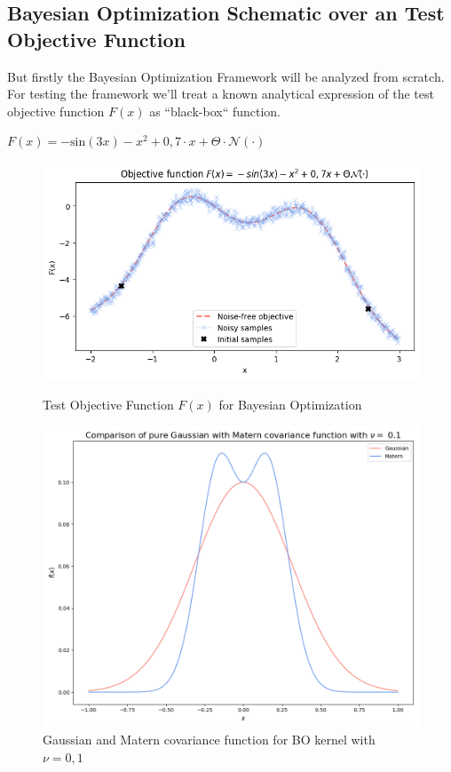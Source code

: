 \documentclass[12pt, a4paper]{article}
\begin{document}
\subsection{Bayesian Optimization Schematic over an Test Objective Function}
But firstly the Bayesian Optimization Framework will be analyzed from scratch. For testing the framework we'll treat a known analytical expression of the test objective function $F(x)$ as ``black-box`` function.
\begin{center}
    $F(x) = - \text{sin}(3x) - x^2 + 0,7 \cdot x + \Theta \cdot \mathcal{N}(\cdot)$ 
\end{center}
\begin{figure}[htbp]
\begin{minipage}[t]{7cm}
\vspace{0pt}
\centering
\includegraphics[width=1\textwidth,trim={0 0 0 0},clip]{figures/bayesian_optimization_from_scratch_objective.png}
\caption[Test Objective Function for Bayesian Optimization]{Test Objective Function $F(x)$ for Bayesian Optimization}
\label{fig: bo_objective}    
\end{minipage}
\hfill
\begin{minipage}[t]{5cm}
\vspace{0pt}
\centering
\includegraphics[width=1\textwidth,trim={0 0 0 0},clip]{figures/covariance_function_matern_gaussian.png}
\caption[Covariance functions for BO kernel]{Gaussian and Matern covariance function for BO kernel with $\nu = 0,1$}
\label{fig: covariance_functions} 
\end{minipage}
\end{figure}
\end{document}
